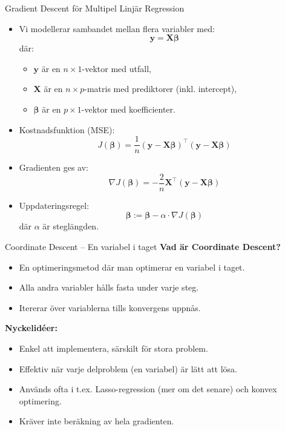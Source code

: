 \documentclass[10pt,english]{beamer}
\begin{document}
\begin{frame}{Gradient Descent för Multipel Linjär Regression}
  \begin{itemize}
    \item Vi modellerar sambandet mellan flera variabler med:
    \[
      \mathbf{y} = \mathbf{X} \boldsymbol{\beta}
    \]
    där:
    \begin{itemize}
      \item $\mathbf{y}$ är en $n \times 1$-vektor med utfall,
      \item $\mathbf{X}$ är en $n \times p$-matris med prediktorer (inkl. intercept),
      \item $\boldsymbol{\beta}$ är en $p \times 1$-vektor med koefficienter.
    \end{itemize}
    \item Kostnadsfunktion (MSE):
    \[
      J(\boldsymbol{\beta}) = \frac{1}{n} (\mathbf{y} - \mathbf{X}\boldsymbol{\beta})^\top (\mathbf{y} - \mathbf{X}\boldsymbol{\beta})
    \]
    \item Gradienten ges av:
    \[
      \nabla J(\boldsymbol{\beta}) = -\frac{2}{n} \mathbf{X}^\top (\mathbf{y} - \mathbf{X}\boldsymbol{\beta})
    \]
    \item Uppdateringsregel:
    \[
      \boldsymbol{\beta} := \boldsymbol{\beta} - \alpha \cdot \nabla J(\boldsymbol{\beta})
    \]
    där $\alpha$ är steglängden.
  \end{itemize}
\end{frame}

\begin{frame}{Coordinate Descent – En variabel i taget}
    \textbf{Vad är Coordinate Descent?}
    \begin{itemize}
        \item En optimeringsmetod där man optimerar en variabel i taget.
        \item Alla andra variabler hålls fasta under varje steg.
        \item Itererar över variablerna tills konvergens uppnås.
    \end{itemize}

    \vspace{0.3cm}
    \textbf{Nyckelidéer:}
    \begin{itemize}
        \item Enkel att implementera, särskilt för stora problem.
        \item Effektiv när varje delproblem (en variabel) är lätt att lösa.
        \item Används ofta i t.ex. Lasso-regression (mer om det senare) och konvex optimering.
        \item Kräver inte beräkning av hela gradienten.
    \end{itemize}
\end{frame}
\end{document}
